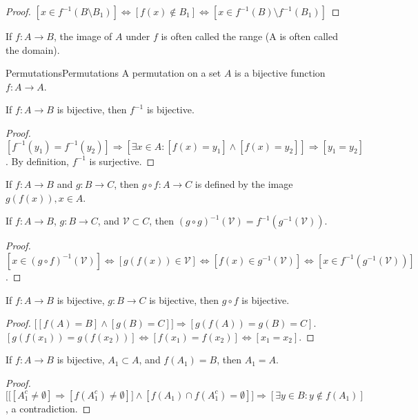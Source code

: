     \begin{proof}
    $[x\in f^{-1}(B\setminus B_1)]\Leftrightarrow [f(x)\notin B_1]\Leftrightarrow [x\in f^{-1}(B)\setminus f^{-1}(B_1)]$
    \end{proof}
    If $f:A\rightarrow B$, the image of $A$ under $f$
    is often called the range (A is often called the domain).
    \begin{ldefinition}{Permutations}{Permutations}
        A permutation on a set $A$ is a bijective function
        $f:A\rightarrow{A}$.
    \end{ldefinition}
    \begin{theorem}
    If $f:A\rightarrow B$ is bijective, then $f^{-1}$ is bijective.
    \end{theorem}
    \begin{proof}
    $[f^{-1}(y_1) = f^{-1}(y_2)]\Rightarrow [\exists x\in A:[f(x) = y_1]\land [f(x)=y_2]]\Rightarrow [y_1=y_2]$. By definition, $f^{-1}$ is surjective.
    \end{proof}
    \begin{definition}
    If $f:A\rightarrow B$ and $g:B\rightarrow C$, then $g\circ f:A\rightarrow C$ is defined by the image $g(f(x)), x\in A$. 
    \end{definition}
    \begin{theorem}
    If $f:A\rightarrow B$, $g:B\rightarrow C$, and $\mathcal{V}\subset C$, then $(g\circ g)^{-1}(\mathcal{V}) = f^{-1}(g^{-1}(\mathcal{V}))$.
    \end{theorem}
    \begin{proof}
    $[x\in (g\circ f)^{-1}(\mathcal{V})]\Leftrightarrow [g(f(x))\in \mathcal{V}] \Leftrightarrow [f(x)\in g^{-1}(\mathcal{V})]\Leftrightarrow [x\in f^{-1}(g^{-1}(\mathcal{V}))]$.
    \end{proof}
    \begin{theorem}
    If $f:A\rightarrow B$ is bijective, $g:B\rightarrow C$ is bijective, then $g\circ f$ is bijective.
    \end{theorem}
    \begin{proof}
    $\big[[f(A) = B]\land [g(B) = C]\big]\Rightarrow [g(f(A)) = g(B) = C]$. $[g(f(x_1))=g(f(x_2))]\Leftrightarrow [f(x_1)=f(x_2)]\Leftrightarrow [x_1=x_2]$.
    \end{proof}
    \begin{theorem}
    If $f:A\rightarrow B$ is bijective, $A_1\subset A$, and $f(A_1) = B$, then $A_1=A$.
    \end{theorem}
    \begin{proof}
    $\Big[\big[[A_1^c \ne \emptyset]\Rightarrow [f(A_1^c) \ne \emptyset]\big]\land[f(A_1)\cap f(A_1^c) = \emptyset]\Big]\Rightarrow [\exists y\in B:y\notin f(A_1)]$, a contradiction.
    \end{proof}